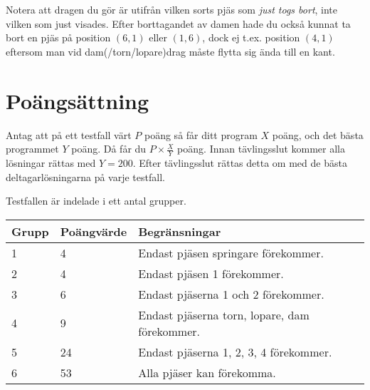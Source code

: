Notera att dragen du gör är utifrån vilken sorts pjäs som \emph{just togs bort}, inte vilken som just visades. Efter borttagandet av damen hade du också kunnat ta bort en pjäs på position $(6, 1)$ eller $(1, 6)$, dock ej t.ex. position $(4, 1)$ eftersom man vid dam(/torn/lopare)drag måste flytta sig ända till en kant.

\section*{Poängsättning}
Antag att på ett testfall värt $P$ poäng så får ditt program $X$ poäng, och det bästa programmet $Y$ poäng.
Då får du $P \times \frac{X}{Y}$ poäng. Innan tävlingsslut kommer alla lösningar rättas med $Y = 200$.
Efter tävlingsslut rättas detta om med de bästa deltagarlösningarna på varje testfall.

Testfallen är indelade i ett antal grupper.

\begin{tabular}{| l | l | l |}
  \hline
  Grupp & Poängvärde & Begränsningar\\ \hline
  1     & 4          & Endast pjäsen springare förekommer. \\ \hline
  2     & 4          & Endast pjäsen 1 förekommer. \\ \hline
  3     & 6          & Endast pjäserna 1 och 2 förekommer. \\ \hline
  4     & 9          & Endast pjäserna torn, lopare, dam förekommer. \\ \hline
  5     & 24         & Endast pjäserna 1, 2, 3, 4 förekommer. \\ \hline
  6     & 53         & Alla pjäser kan förekomma. \\ \hline
\end{tabular}
